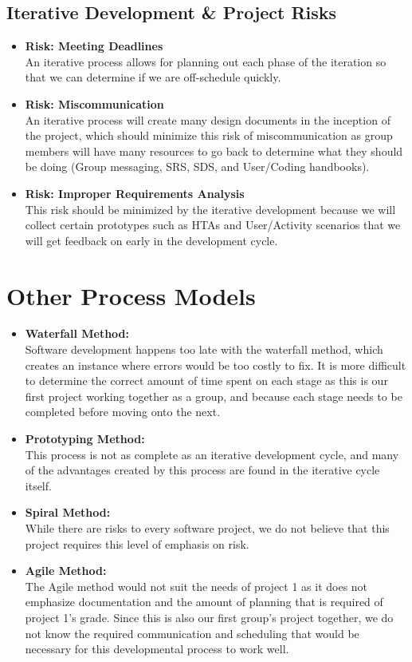 \documentclass[a4paper, 11pt]{article}
\begin{document}
\subsection{Iterative Development \& Project Risks}
\begin{itemize}
	\item \textbf{Risk: Meeting Deadlines} \\ An iterative process allows for planning out each phase of the iteration so that we can determine if we are off-schedule quickly.
	\item \textbf{Risk: Miscommunication} \\ An iterative process will create many design documents in the inception of the project, which should minimize this risk of miscommunication as group members will have many resources to go back to determine what they should be doing (Group messaging, SRS, SDS, and User/Coding handbooks).
	\item \textbf{Risk: Improper Requirements Analysis} \\ This risk should be minimized by the iterative development because we will collect certain prototypes such as HTAs and User/Activity scenarios that we will get feedback on early in the development cycle.
\end{itemize}

\section{Other Process Models}

\begin{itemize}
	\item \textbf{Waterfall Method:}\\ Software development happens too late with the waterfall method, which creates an instance where errors would be too costly to fix. It is more difficult to determine the correct amount of time spent on each stage as this is our first project working together as a group, and because each stage needs to be completed before moving onto the next.
	\item \textbf{Prototyping Method:}\\ This process is not as complete as an iterative development cycle, and many of the advantages created by this process are found in the iterative cycle itself.
	\item \textbf{Spiral Method:}\\ While there are risks to every software project, we do not believe that this project requires this level of emphasis on risk.
	\item \textbf{Agile Method:}\\ The Agile method would not suit the needs of project 1 as it does not emphasize documentation and the amount of planning that is required of project 1's grade. Since this is also our first group's project together, we do not know the required communication and scheduling that would be necessary for this developmental process to work well.
\end{itemize}
 
\end{document}
